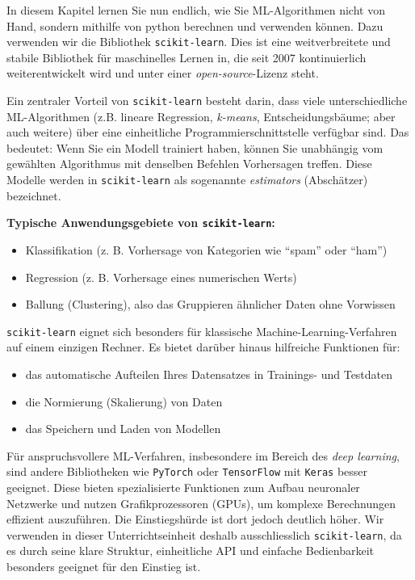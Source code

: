 \begin{lpu}
In diesem Kapitel lernen Sie nun endlich, wie Sie ML-Algorithmen nicht von Hand, sondern mithilfe von python berechnen und verwenden können. Dazu verwenden wir die Bibliothek \texttt{scikit-learn}. Dies ist eine weitverbreitete und stabile Bibliothek für maschinelles Lernen in, die seit 2007 kontinuierlich weiterentwickelt wird und unter einer \textit{open-source}-Lizenz steht.

Ein zentraler Vorteil von \texttt{scikit-learn} besteht darin, dass viele unterschiedliche ML-Algorithmen (z.B. lineare Regression, \textit{k-means}, Entscheidungsbäume; aber auch weitere) über eine einheitliche Programmierschnittstelle verfügbar sind. Das bedeutet: Wenn Sie ein Modell trainiert haben, können Sie unabhängig vom gewählten Algorithmus mit denselben Befehlen Vorhersagen treffen. Diese Modelle werden in \texttt{scikit-learn} als sogenannte \textit{estimators} (Abschätzer) bezeichnet.

\vspace{0.5em}
\textbf{Typische Anwendungsgebiete von \texttt{scikit-learn}:}
\begin{itemize}
  \item Klassifikation (z. B. Vorhersage von Kategorien wie ``spam'' oder ``ham'')
  \item Regression (z. B. Vorhersage eines numerischen Werts)
  \item Ballung (Clustering), also das Gruppieren ähnlicher Daten ohne Vorwissen
\end{itemize}

\vspace{0.5em}
\texttt{scikit-learn} eignet sich besonders für klassische Machine-Learning-Verfahren auf einem einzigen Rechner. Es bietet darüber hinaus hilfreiche Funktionen für:
\begin{itemize}
  \item das automatische Aufteilen Ihres Datensatzes in Trainings- und Testdaten
  \item die Normierung (Skalierung) von Daten
  \item das Speichern und Laden von Modellen
\end{itemize}

Für anspruchsvollere ML-Verfahren, insbesondere im Bereich des \textit{deep learning}, sind andere Bibliotheken wie \texttt{PyTorch} oder \texttt{TensorFlow} mit \texttt{Keras} besser geeignet. Diese bieten spezialisierte Funktionen zum Aufbau neuronaler Netzwerke und nutzen Grafikprozessoren (GPUs), um komplexe Berechnungen effizient auszuführen. Die Einstiegshürde ist dort jedoch deutlich höher. Wir verwenden in dieser Unterrichtseinheit deshalb ausschliesslich \texttt{scikit-learn}, da es durch seine klare Struktur, einheitliche API und einfache Bedienbarkeit besonders geeignet für den Einstieg ist.


\end{lpu}
